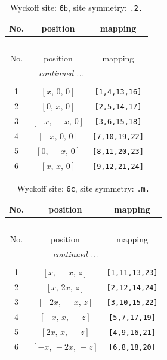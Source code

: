 \documentclass[fleqn,8pt]{jsarticle}
\begin{document}
\begin{longtable}{ccc}
\caption{Wyckoff site: {\tt 6b}, site symmetry: {\tt .2.}}
 \\
 \hline \hline
No. & position & mapping \\ \hline \endfirsthead

\multicolumn{2}{l}{\tablename\ \thetable{}} \\
 \hline \hline
No. & position & mapping \\ \hline \endhead

 \hline \hline
\multicolumn{2}{r}{\footnotesize\it continued ...} \\ \endfoot

 \hline \hline
\multicolumn{2}{r}{} \\ \endlastfoot

1 & $\left[ x,\, 0,\, 0 \right]$ & {\tt [1,4,13,16]} \\ \hline
2 & $\left[ 0,\, x,\, 0 \right]$ & {\tt [2,5,14,17]} \\ \hline
3 & $\left[ - x,\, - x,\, 0 \right]$ & {\tt [3,6,15,18]} \\ \hline
4 & $\left[ - x,\, 0,\, 0 \right]$ & {\tt [7,10,19,22]} \\ \hline
5 & $\left[ 0,\, - x,\, 0 \right]$ & {\tt [8,11,20,23]} \\ \hline
6 & $\left[ x,\, x,\, 0 \right]$ & {\tt [9,12,21,24]} \\
\end{longtable}
\renewcommand{\arraystretch}{1.2}
\begin{longtable}{ccc}
\caption{Wyckoff site: {\tt 6c}, site symmetry: {\tt .m.}}
 \\
 \hline \hline
No. & position & mapping \\ \hline \endfirsthead

\multicolumn{2}{l}{\tablename\ \thetable{}} \\
 \hline \hline
No. & position & mapping \\ \hline \endhead

 \hline \hline
\multicolumn{2}{r}{\footnotesize\it continued ...} \\ \endfoot

 \hline \hline
\multicolumn{2}{r}{} \\ \endlastfoot

1 & $\left[ x,\, - x,\, z \right]$ & {\tt [1,11,13,23]} \\ \hline
2 & $\left[ x,\, 2 x,\, z \right]$ & {\tt [2,12,14,24]} \\ \hline
3 & $\left[ - 2 x,\, - x,\, z \right]$ & {\tt [3,10,15,22]} \\ \hline
4 & $\left[ - x,\, x,\, - z \right]$ & {\tt [5,7,17,19]} \\ \hline
5 & $\left[ 2 x,\, x,\, - z \right]$ & {\tt [4,9,16,21]} \\ \hline
6 & $\left[ - x,\, - 2 x,\, - z \right]$ & {\tt [6,8,18,20]} \\
\end{longtable}
\end{document}
